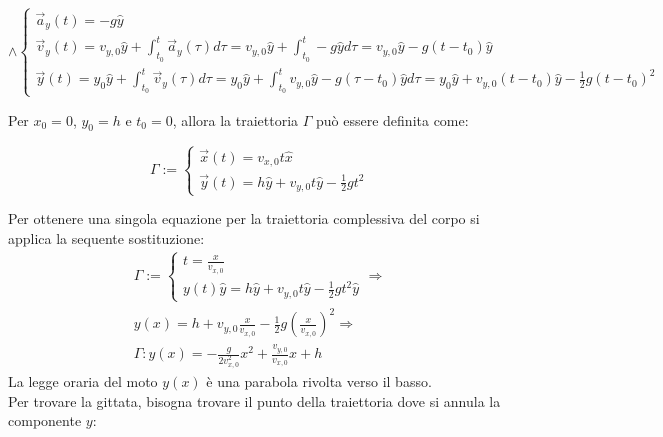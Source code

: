 \documentclass{article}
\numberwithin{equation}{subsection}
\begin{document}
\begin{equation}
    \land
    \begin{cases}
        \vec{a}_y(t)=-g\hat{y}\\
        \vec{v}_y(t)=\displaystyle v_{y,0}\hat{y}+\int_{t_0}^{t}\vec{a}_y(\tau)d\tau=v_{y,0}\hat{y}+\int_{t_0}^{t}-g\hat{y}d\tau=v_{y,0}\hat{y}-g(t-t_0)\hat{y}\\
        \vec{y}(t)=y_0\hat{y} +\displaystyle\int_{t_0}^{t}\vec{v}_y(\tau)d\tau=y_0\hat{y}+\int_{t_0}^{t}v_{y,0}\hat{y}-g(\tau-t_0)\hat{y}d\tau=
        y_0\hat{y}+v_{y,0}(t-t_0)\hat{y}-\frac{1}{2}g(t-t_0)^{2}
    \end{cases}
\end{equation}

Per $x_0 = 0$, $y_0 = h$ e $t_0 = 0$, allora la traiettoria 
$\Gamma$ può essere definita come:

\begin{equation}
    \Gamma:=
    \begin{cases}
        \vec{x}(t)=v_{x,0}t\hat{x}\\
        \vec{y}(t)=\displaystyle h\hat{y}+v_{y,0}t\hat{y}-\frac{1}{2}gt^{2}
    \end{cases}
\end{equation}

Per ottenere una singola equazione per la traiettoria complessiva 
del corpo si applica la sequente sostituzione:
\begin{gather}
    \Gamma:=
    \begin{cases}
        \displaystyle t = \frac{x}{v_{x,0}}\\
        {y}(t)\hat{y}=h\hat{y}+v_{y,0}t\hat{y}-\displaystyle\frac{1}{2}gt^{2}\hat{y}
    \end{cases}
    \Rightarrow\\
    \displaystyle y(x)=h+v_{y,0}\frac{x}{v_{x,0}}-\frac{1}{2}g\left(\frac{x}{v_{x,0}}
    \right)^{2}\Rightarrow\\
    \Gamma:y(x)\displaystyle=-\frac{g}{2v_{x,0}^{2}}x^{2}+\frac{v_{y,0}}{v_{x,0}}x+h
\end{gather}
La legge oraria del moto $y(x)$ è una parabola rivolta verso 
il basso.\\

Per trovare la gittata, bisogna trovare il punto della traiettoria 
dove si annula la componente $y$:
\end{document}
